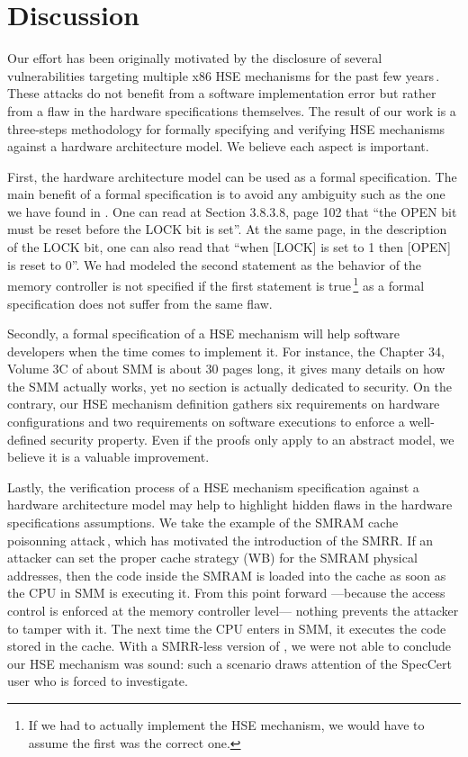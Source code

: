 \section{Discussion} \label{sec:speccert:discuss}

Our effort has been originally motivated by the disclosure of several
vulnerabilities targeting multiple x86 HSE mechanisms for the past few
years\,\cite{wojtczuk2009smram,duflot2009smram,rutkowska2008remap,domas2015sinkhole,kallenberg2015racecondition}. These
attacks do not benefit from a software implementation error but rather from a
flaw in the hardware specifications themselves. The result of our work is a
three-steps methodology for formally specifying and verifying HSE mechanisms
against a hardware architecture model. We believe each aspect is important.

First, the hardware architecture model can be used as a formal specification.
The main benefit of a formal specification is to avoid any ambiguity such as the
one we have found in \cite{intel2009mch}. One can read at Section 3.8.3.8, page
102 that “the OPEN bit must be reset before the LOCK bit is set”.  At the same
page, in the description of the LOCK bit, one can also read that “when [LOCK] is
set to 1 then [OPEN] is reset to 0”. We had modeled the second statement as the
behavior of the memory controller is not specified if the first statement is
true\,\footnote{If we had to actually implement the HSE mechanism, we would have
  to assume the first was the correct one.}   as a formal
specification does not suffer from the same flaw.

Secondly, a formal specification of a HSE mechanism will help software
developers when the time comes to implement it. For instance, the Chapter 34,
Volume 3C of \cite{intel2014manual} about SMM is about 30 pages long, it gives
many details on how the SMM actually works, yet no section is actually dedicated
to security. On the contrary, our HSE mechanism definition gathers six
requirements on hardware configurations and two requirements on software
executions to enforce a well-defined security property. Even if the proofs only
apply to an abstract model, we believe it is a valuable improvement.

Lastly, the verification process of a HSE mechanism specification against a
hardware architecture model may help to highlight hidden flaws in the hardware
specifications assumptions. We take the example of the SMRAM cache poisonning
attack\,\cite{wojtczuk2009smram,duflot2009smram}, which has motivated the
introduction of the SMRR. If an attacker can set the proper cache strategy (WB)
for the SMRAM physical addresses, then the code inside the SMRAM is loaded into
the cache as soon as the CPU in SMM is executing it. From this point forward
---because the access control is enforced at the memory controller level---
nothing prevents the attacker to tamper with it. The next time the CPU enters in
SMM, it executes the code stored in the cache. With a SMRR-less version of
, we were not able to conclude our HSE mechanism was sound:
such a scenario draws attention of the SpecCert user who is forced to
investigate.

